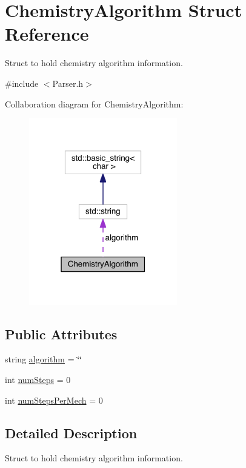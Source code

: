 \hypertarget{structChemistryAlgorithm}{\section{Chemistry\+Algorithm Struct Reference}
\label{structChemistryAlgorithm}
}


Struct to hold chemistry algorithm information.  




{\ttfamily \#include $<$Parser.\+h$>$}



Collaboration diagram for Chemistry\+Algorithm\+:\nopagebreak
\begin{figure}[H]
\begin{center}
\leavevmode
\includegraphics[width=183pt]{structChemistryAlgorithm__coll__graph}
\end{center}
\end{figure}
\subsection*{Public Attributes}
\begin{DoxyCompactItemize}
\item 
string \hyperlink{structChemistryAlgorithm_a79823d8025ebda7f40a0fa7683008ce2}{algorithm} = \char`\"{}\char`\"{}
\item 
int \hyperlink{structChemistryAlgorithm_a6ba1dded2edadb96427909fcead6cdeb}{num\+Steps} = 0
\item 
int \hyperlink{structChemistryAlgorithm_a8f1e4fb749816d74760c866b8beb0884}{num\+Steps\+Per\+Mech} = 0
\end{DoxyCompactItemize}


\subsection{Detailed Description}
Struct to hold chemistry algorithm information. 

